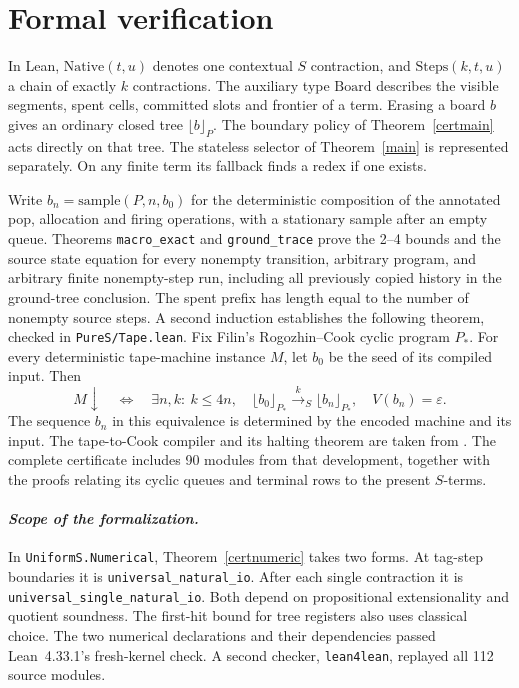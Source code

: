 \section{Formal verification}
In Lean, \(\mathrm{Native}(t,u)\) denotes one contextual \(S\) contraction, and \(\mathrm{Steps}(k,t,u)\) a chain of exactly \(k\) contractions. The auxiliary type \(\mathrm{Board}\) describes the visible segments, spent cells, committed slots and frontier of a term. Erasing a board \(b\) gives an ordinary closed tree \(\lfloor b\rfloor_P\). The boundary policy of Theorem~\ref{certmain} acts directly on that tree. The stateless selector of Theorem~\ref{main} is represented separately. On any finite term its fallback finds a redex if one exists.

Write \(b_n=\mathrm{sample}(P,n,b_0)\) for the deterministic composition of the annotated pop, allocation and firing operations, with a stationary sample after an empty queue. Theorems \texttt{macro\_exact} and \texttt{ground\_trace} prove the 2--4 bounds and the source state equation for every nonempty transition, arbitrary program, and arbitrary finite nonempty-step run, including all previously copied history in the ground-tree conclusion. The spent prefix has length equal to the number of nonempty source steps. A second induction establishes the following theorem, checked in \texttt{PureS/Tape.lean}. Fix Filin's Rogozhin--Cook cyclic program \(P_*\). For every deterministic tape-machine instance \(M\), let \(b_0\) be the seed of its compiled input. Then
\[
 M\downarrow\quad\Longleftrightarrow\quad
 \exists n,k:\ k\le4n,\quad
 \lfloor b_0\rfloor_{P_*}\xrightarrow{k}_{S}\lfloor b_n\rfloor_{P_*},
 \quad V(b_n)=\varepsilon .
\]
The sequence \(b_n\) in this equivalence is determined by the encoded machine and its input. The tape-to-Cook compiler and its halting theorem are taken from \cite{filin}. The complete certificate includes 90 modules from that development, together with the proofs relating its cyclic queues and terminal rows to the present \(S\)-terms.

\paragraph{\textit{Scope of the formalization.}}
In \texttt{UniformS.Numerical}, Theorem~\ref{certnumeric} takes two forms. At tag-step boundaries it is \nolinkurl{universal_natural_io}. After each single contraction it is \nolinkurl{universal_single_natural_io}. Both depend on propositional extensionality and quotient soundness. The first-hit bound for tree registers also uses classical choice. The two numerical declarations and their dependencies passed Lean~4.33.1's fresh-kernel check. A second checker, \texttt{lean4lean}, replayed all 112 source modules.

